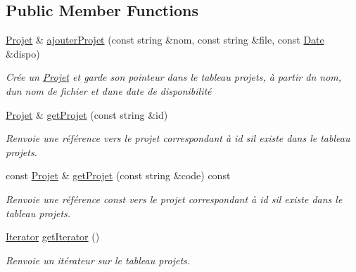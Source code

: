 \subsection*{Public Member Functions}
\begin{DoxyCompactItemize}
\item 
\hyperlink{class_projet}{Projet} \& \hyperlink{class_projet_manager_a1deef0505a26f2b14e7d2a35e1fead59}{ajouter\+Projet} (const string \&nom, const string \&file, const \hyperlink{class_t_i_m_e_1_1_date}{Date} \&dispo)
\begin{DoxyCompactList}\small\item\em Crée un \hyperlink{class_projet}{Projet} et garde son pointeur dans le tableau projets, à partir d\textquotesingle{}n nom, d\textquotesingle{}un nom de fichier et d\textquotesingle{}une date de disponibilité \end{DoxyCompactList}\item 
\hyperlink{class_projet}{Projet} \& \hyperlink{class_projet_manager_aef6c8f10713e04d8e5e2592a8ab611e9}{get\+Projet} (const string \&id)
\begin{DoxyCompactList}\small\item\em Renvoie une référence vers le projet correspondant à id s\textquotesingle{}il existe dans le tableau projets. \end{DoxyCompactList}\item 
const \hyperlink{class_projet}{Projet} \& \hyperlink{class_projet_manager_a6287b1b73903f5458895135b2e6ca8f8}{get\+Projet} (const string \&code) const 
\begin{DoxyCompactList}\small\item\em Renvoie une référence const vers le projet correspondant à id s\textquotesingle{}il existe dans le tableau projets. \end{DoxyCompactList}\item 
\hyperlink{class_projet_manager_1_1_iterator}{Iterator} \hyperlink{class_projet_manager_ad326876aa4985f2b05a19d0750a8aa5e}{get\+Iterator} ()
\begin{DoxyCompactList}\small\item\em Renvoie un itérateur sur le tableau projets. \end{DoxyCompactList}\end{DoxyCompactItemize}
